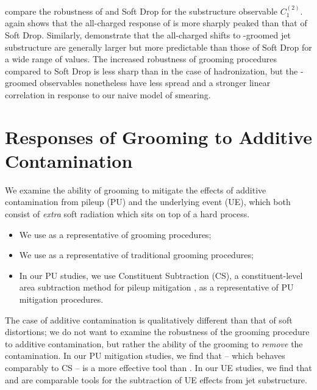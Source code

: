  compare the robustness of  and Soft Drop for the substructure observable \(C_1^{(2)}\).
%
 again shows that the all-charged response of  is more sharply peaked than that of Soft Drop.
%
Similarly,  demonstrate that the all-charged shifts to \PIRANHA{}-groomed jet substructure are generally larger but more predictable than those of Soft Drop for a wide range of \zcut{} values.
%
The increased robustness of \PIRANHA{} grooming procedures compared to Soft Drop is less sharp than in the case of hadronization, but the \PIRANHA{}-groomed observables nonetheless have less spread and a stronger linear correlation in response to our naive model of smearing.


\section{Responses of Grooming to Additive Contamination}
\label{sec:add_contam}

We examine the ability of \PIRANHA{} grooming to mitigate the effects of additive contamination from pileup (PU) and the underlying event (UE), which both consist of \textit{extra} soft radiation which sits on top of a hard process.
%
\begin{itemize}
    \item We use  as a representative of \PIRANHA{} grooming procedures;
    \item We use  as a representative of traditional grooming procedures;
    \item In our PU studies, we use Constituent Subtraction (CS), a constituent-level area subtraction method for pileup mitigation \cite{Berta:2014eza}, as a representative of PU mitigation procedures.
\end{itemize}
%
The case of additive contamination is qualitatively different than that of soft distortions;
%
we do not want to examine the robustness of the grooming procedure to additive contamination, but rather the ability of the grooming to \textit{remove} the contamination.
%
In our PU mitigation studies, we find that  -- which behaves comparably to CS -- is a more effective tool than .
%
In our UE studies, we find that  and  are comparable tools for the subtraction of UE effects from jet substructure.

